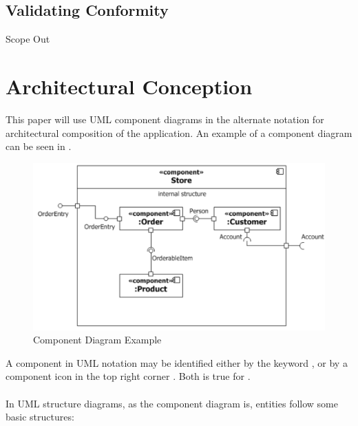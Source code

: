 \subsection{Validating Conformity}
Scope Out

\section{Architectural Conception}
This paper will use UML component diagrams in the alternate notation \parencite[cf.][212]{ObjectManagementGroup.01.03.2015} for architectural composition of the application. An example of a component diagram can be seen in .

\begin{figure}
    \centering
    \includegraphics[width=\textwidth]{img/componentExample.pdf}
    \caption[Component Diagram Example]{Component Diagram Example \parencites[2132]{ObjectManagementGroup.01.03.2015}}
    \label{fig:comEx}
\end{figure}

A component in UML notation may be identified either by the keyword , or by a component icon in the top right corner \parencites[cf.][208]{ObjectManagementGroup.01.03.2015}. Both is true for . 

\paragraph{} In UML structure diagrams, as the component diagram is, entities follow some basic structures:

